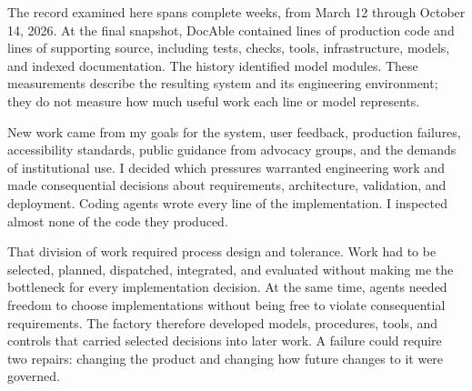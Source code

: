 The record examined here spans  complete weeks, from March 12 through October 14, 2026. At the final snapshot, DocAble contained  lines of production code and  lines of supporting source, including tests, checks, tools, infrastructure, models, and indexed documentation. The history identified  model modules. These measurements describe the resulting system and its engineering environment; they do not measure how much useful work each line or model represents.


New work came from my goals for the system, user feedback, production failures, accessibility standards, public guidance from advocacy groups\citep{nfb-accessible-documents-2014}, and the demands of institutional use. I decided which pressures warranted engineering work and made consequential decisions about requirements, architecture, validation, and deployment. Coding agents wrote every line of the implementation. I inspected almost none of the code they produced.


That division of work required process design and tolerance. Work had to be selected, planned, dispatched, integrated, and evaluated without making me the bottleneck for every implementation decision. At the same time, agents needed freedom to choose implementations without being free to violate consequential requirements. The factory therefore developed models, procedures, tools, and controls that carried selected decisions into later work. A failure could require two repairs: changing the product and changing how future changes to it were governed.



